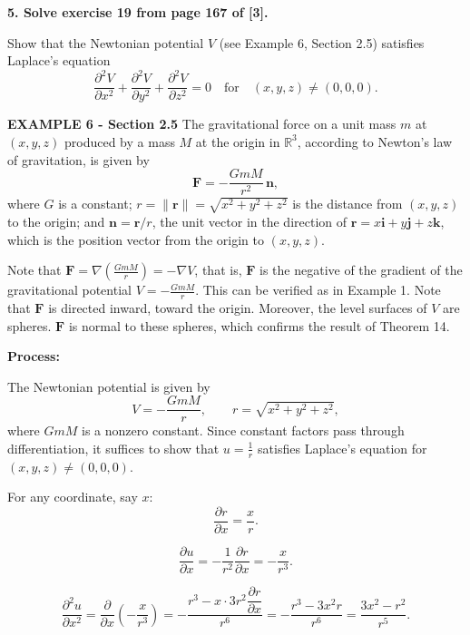 \textbf{5. Solve exercise 19 from page 167 of [3].}
\begin{respuesta}
    {Show that the Newtonian potential \(V\) (see Example 6, Section 2.5) satisfies Laplace’s equation
\[
\frac{\partial^2 V}{\partial x^2} + \frac{\partial^2 V}{\partial y^2} + \frac{\partial^2 V}{\partial z^2} = 0
\quad \text{for} \quad (x,y,z) \neq (0,0,0).
\]}

{\textbf{EXAMPLE 6 - Section 2.5} \quad The gravitational force on a unit mass \(m\) at \((x,y,z)\) produced by a mass \(M\) at the origin in \(\mathbb{R}^3\), according to Newton’s law of gravitation, is given by
\[
\mathbf{F} = -\frac{G m M}{r^2}\,\mathbf{n},
\]
where \(G\) is a constant; \(r = \|\mathbf{r}\| = \sqrt{x^2 + y^2 + z^2}\) is the distance from \((x,y,z)\) to the origin; and \(\mathbf{n} = \mathbf{r}/r\), the unit vector in the direction of \(\mathbf{r} = x\mathbf{i} + y\mathbf{j} + z\mathbf{k}\), which is the position vector from the origin to \((x,y,z)\).

Note that \(\mathbf{F} = \nabla\!\left(\frac{G m M}{r}\right) = -\nabla V\), that is, \(\mathbf{F}\) is the negative of the gradient of the gravitational potential \(V = -\frac{G m M}{r}\). This can be verified as in Example 1. Note that \(\mathbf{F}\) is directed inward, toward the origin. Moreover, the level surfaces of \(V\) are spheres. \(\mathbf{F}\) is normal to these spheres, which confirms the result of Theorem 14.}




\textbf{Process:}

The Newtonian potential is given by
\[
V = -\frac{GmM}{r}, \qquad r = \sqrt{x^2+y^2+z^2},
\]
where $GmM$ is a nonzero constant. Since constant factors pass through differentiation, it suffices to show that $u = \tfrac{1}{r}$ satisfies Laplace's equation for $(x,y,z)\neq(0,0,0)$.

\medskip
{} \; For any coordinate, say $x$:
\[
\frac{\partial r}{\partial x} = \frac{x}{r}.
\]

\[
\frac{\partial u}{\partial x}
= -\frac{1}{r^2}\frac{\partial r}{\partial x}
= -\frac{x}{r^3}.
\]

\[
\frac{\partial^2 u}{\partial x^2}
= \frac{\partial}{\partial x}\!\left(-\frac{x}{r^3}\right)
= -\frac{r^3 - x\cdot 3r^2\dfrac{\partial r}{\partial x}}{r^6}
= -\frac{r^3 - 3x^2 r}{r^6}
= \frac{3x^2 - r^2}{r^5}.
\]


\end{respuesta}
